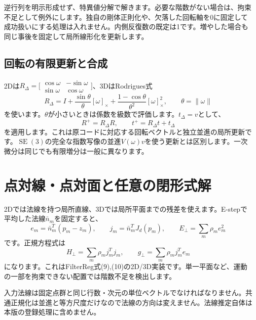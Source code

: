\documentclass[a4paper,11pt]{article}
\newcommand{\SE}{\operatorname{SE}}
\newcommand{\norm}[1]{\left\lVert#1\right\rVert}
\numberwithin{equation}{section}
\begin{document}
逆行列を明示形成せず、特異値分解で解きます。必要な階数がない場合は、拘束不足として例外にします。独自の剛体正則化や、欠落した回転軸を0に固定して成功扱いにする処理は入れません。内側反復数の既定は1です。増やした場合も同じ事後を固定して局所線形化を更新します。

\subsection{回転の有限更新と合成}
2Dは\(R_\Delta=\bigl[\begin{smallmatrix}\cos\omega&-\sin\omega\\\sin\omega&\cos\omega\end{smallmatrix}\bigr]\)、3DはRodrigues式
\begin{equation}
 R_\Delta=I+\frac{\sin\theta}{\theta}[\omega]_\times+
       \frac{1-\cos\theta}{\theta^2}[\omega]_\times^2,
 \qquad \theta=\norm{\omega}
\end{equation}
を使います。\(\theta\)が小さいときは係数を級数で評価します。\(t_\Delta=v\)として、
\begin{equation}
 R^+=R_\Delta R,\qquad t^+=R_\Delta t+t_\Delta
\end{equation}
を適用します。これは原コードに対応する回転ベクトルと独立並進の局所更新です。\(\SE(3)\)の完全な指数写像の並進\(V(\omega)v\)を使う更新とは区別します。一次微分は同じでも有限増分は一般に異なります。

\section{点対線・点対面と任意の閉形式解}\label{sec:plane}
2Dでは法線を持つ局所直線、3Dでは局所平面までの残差を使えます。E-stepで平均した法線\(\bar n_m\)を固定すると、
\begin{equation}
 e_m=\bar n_m^T(p_m-z_m),\qquad j_m=\bar n_m^TJ_d(p_m),\qquad
 E_\perp=\sum_m\rho_me_m^2
\end{equation}
です。正規方程式は
\begin{equation}
 H_\perp=\sum_m\rho_mj_m^Tj_m,\qquad
 g_\perp=\sum_m\rho_mj_m^Te_m
\end{equation}
になります。これはFilterReg式(9),(10)の2D/3D実装です。単一平面など、運動の一部を拘束できない配置では階数不足を検出します。\cite{fr}

入力法線は固定点群と同じ行数・次元の単位ベクトルでなければなりません。共通正規化は並進と等方尺度だけなので法線の方向は変えません。法線推定自体は本版の登録処理に含めません。
\end{document}
